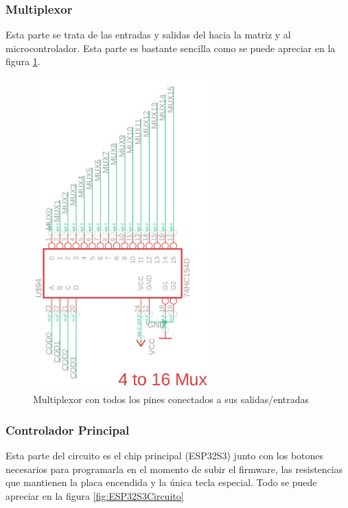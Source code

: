 \newpage
\subsubsection{\gls{Multiplexor}}
Esta parte se trata de las entradas y salidas del  hacia la matriz y al microcontrolador. Esta parte es bastante sencilla como se puede apreciar en la figura \ref{fig:MuxImagenCircuito}.

\begin{figure}[H]
    \centering
    \includegraphics[width=0.6\textwidth]{imagenes/Capitulos/Cap04/Mux.png}
    \caption{\gls{Multiplexor} con todos los pines conectados a sus salidas/entradas \cite{Repo:ImagenCircuito}}
    \label{fig:MuxImagenCircuito}
\end{figure}

\newpage
\subsubsection{Controlador Principal}
Esta parte del circuito es el chip principal (ESP32S3) junto con los botones necesarios para programarla en el momento de subir el firmware, las resistencias que mantienen la placa encendida y la única tecla especial. Todo se puede apreciar en la figura \ref{fig:ESP32S3Circuito}

